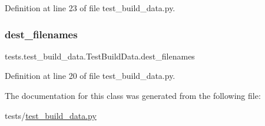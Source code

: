 Definition at line 23 of file test\+\_\+build\+\_\+data.\+py.

\mbox{\label{classtests_1_1test__build__data_1_1TestBuildData_a44c09a6faf9f298de2d4a094a25a9f17}} 
\subsubsection{\texorpdfstring{dest\+\_\+filenames}{dest\_filenames}}
{\footnotesize\ttfamily tests.\+test\+\_\+build\+\_\+data.\+Test\+Build\+Data.\+dest\+\_\+filenames\hspace{0.3cm}{\ttfamily [static]}}



Definition at line 20 of file test\+\_\+build\+\_\+data.\+py.



The documentation for this class was generated from the following file\+:\begin{DoxyCompactItemize}
\item 
tests/\hyperlink{test__build__data_8py}{test\+\_\+build\+\_\+data.\+py}\end{DoxyCompactItemize}
